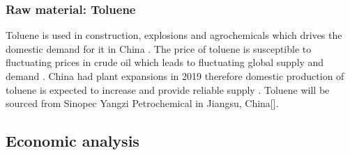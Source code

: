 \subsubsection{Raw material: Toluene}
Toluene is used in construction, explosions and agrochemicals which drives the domestic demand for it in China \cite{reportbuyer_global_nodate} . The price of toluene is susceptible to fluctuating prices in crude oil which leads to fluctuating global supply and demand \cite{noauthor_toluene_nodate-1}. China had plant expansions in 2019 \cite{zhang_china_nodate} therefore domestic production of toluene is expected to increase and provide reliable supply \cite{noauthor_toluene_nodate}. Toluene will be sourced from Sinopec Yangzi Petrochemical in Jiangsu, China[].

\subsection{Economic analysis}
